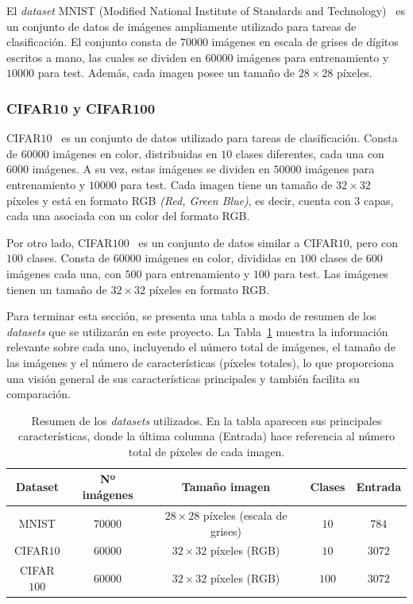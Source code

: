El \textit{dataset} MNIST (Modified National Institute of Standards and Technology)~\cite{LeCun1998} es un conjunto de datos de imágenes ampliamente utilizado para tareas de clasificación. El conjunto consta de $70000$ imágenes en escala de grises de dígitos escritos a mano, las cuales se dividen en $60000$ imágenes para entrenamiento y $10000$ para test. Además, cada imagen posee un tamaño de $28 \times 28$ píxeles.

\subsubsection{CIFAR10 y CIFAR100}\label{subsubsec:CIFAR10-y-CIFAR100}

CIFAR$10$~\cite{Krizhevsky2009} es un conjunto de datos utilizado para tareas de clasificación. Consta de $60000$ imágenes en color, distribuidas en $10$ clases diferentes, cada una con $6000$ imágenes. A su vez, estas imágenes se dividen en $50000$ imágenes para entrenamiento y $10000$ para test. Cada imagen tiene un tamaño de $32 \times 32$ píxeles y está en formato RGB \textit{(Red, Green Blue)}, es decir, cuenta con $3$ capas, cada una asociada con un color del formato RGB.

Por otro lado, CIFAR$100$~\cite{Krizhevsky2009} es un conjunto de datos similar a CIFAR$10$, pero con $100$ clases. Consta de $60000$ imágenes en color, divididas en $100$ clases de $600$ imágenes cada una, con $500$ para entrenamiento y $100$ para test. Las imágenes tienen un tamaño de $32 \times 32$ píxeles en formato RGB.

Para terminar esta sección, se presenta una tabla a modo de resumen de los \textit{datasets} que se utilizarán en este proyecto. La Tabla~\ref{tab:datasets} muestra la información relevante sobre cada uno, incluyendo el número total de imágenes, el tamaño de las imágenes y el número de características (píxeles totales), lo que proporciona una visión general de sus características principales y también facilita su comparación.

\begin{table}[h]
    \centering
    \begin{tabular}{|c|c|c|c|c|}
    \hline
    \textbf{Dataset} & \textbf{Nº imágenes} & \textbf{Tamaño imagen} & \textbf{Clases} & \textbf{Entrada} \\
    \hline
    MNIST & $70000$ & $28 \times 28$ píxeles (escala de grises) & $10$ & $784$ \\
    CIFAR$10$ & $60000$ & $32 \times 32$ píxeles (RGB) & $10$ & $3072$ \\
    CIFAR$100$ & $60000$ & $32 \times 32$ píxeles (RGB) & $100$ & $3072$ \\
    \hline
    \end{tabular}
    \caption[Resumen de los \textit{datasets} utilizados.]{Resumen de los \textit{datasets} utilizados. En la tabla aparecen sus principales características, donde la última columna (Entrada) hace referencia al número total de píxeles de cada imagen.}\label{tab:datasets}
\end{table}

